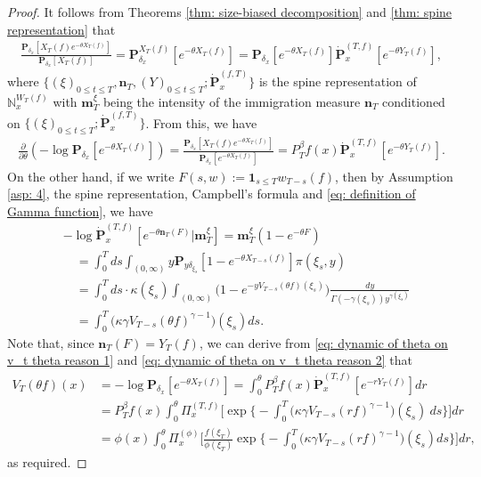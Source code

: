 \documentclass[12pt,a4paper]{amsart}
\theoremstyle{definition}
\numberwithin{equation}{section}
\begin{document}
\begin{proof}
	It follows from Theorems \ref{thm: size-biased decomposition} and \ref{thm: spine representation} that
  \begin{align}
    \frac{ \mathbf P_{\delta_x}[X_T(f)e^{-\theta X_T(f)}] } {  \mathbf P_{\delta_x} [X_T(f)] }
    = \mathbf P_{\delta_x}^{X_T(f)} [e^{-\theta X_T(f)}]
    = \mathbf P_{\delta_x} [e^{-\theta X_T(f)}] \dot {\mathbf P}_x^{(T,f)}[e^{-\theta Y_T(f)}],
\end{align}
where $\{(\xi)_{0\le t\le T}, \mathbf n_T, (Y)_{0\le t\le T}; \dot {\mathbf P}^{(f,T)}_x\}$ is the spine representation of $\mathbb N^{W_T(f)}_x$ with $\mathbf m^\xi_T$ being the intensity of the immigration measure $\mathbf n_T$ conditioned on $\{(\xi)_{0\le t\le T}; \dot {\mathbf P}^{(f,T)}_x\}$.
From this, we have
\begin{align} \label{eq: dynamic of theta on v_t theta reason 1}
	\frac{\partial}{\partial \theta}
	(-\log \mathbf P_{\delta_x}[e^{-\theta X_T(f)}])
	= \frac{\mathbf P_{\delta_x}[X_T(f)e^{-\theta X_T(f)}]}{\mathbf P_{\delta_x}[e^{-\theta X_T(f)}]}
	= P^\beta_T f(x) \dot {\mathbf P}_x^{(T,f)}[e^{-\theta Y_T(f)}].
\end{align}
On the other hand, if we write $F(s,w):= \mathbf 1_{s\leq T} w_{T-s}(f)$, then by Assumption \ref{asp: 4}, the spine representation, Campbell's formula and \eqref{eq: definition of Gamma function}, we have
\begin{align}\label{eq: dynamic of theta on v_t theta reason 2}
	&-\log \dot {\mathbf P}^{(T,f)}_{x}[e^{-\theta \mathbf n_T(F)}|\mathbf m_T^\xi]
   = \mathbf m_T^\xi(1-e^{-\theta F})
	\\ & \quad = \int_0^T ds \int_{(0,\infty)} y \mathbf P_{y\delta_{\xi_s}}[1- e^{-\theta X_{T-s}(f)}] \pi(\xi_s,y)
	\\ & \quad = \int_0^T ds \cdot \kappa(\xi_s) \int_{(0,\infty)} \mathbf (1- e^{- y V_{T-s}(\theta f)(\xi_s)}) \frac{dy}{\Gamma(-\gamma(\xi_s)) y^{\gamma(\xi_s)}}
	\\ & \quad = \int_0^T \big(\kappa\gamma V_{T-s}(\theta f)^{\gamma-1}\big)(\xi_s) ds.
\end{align}
Note that, since $\mathbf n_T(F)= Y_T(f)$, we can derive from \eqref{eq: dynamic of theta on v_t theta reason 1} and \eqref{eq: dynamic of theta on v_t theta reason 2} that
\begin{align}
	V_T(\theta f)(x)
	&= -\log \mathbf P_{\delta_x}[e^{-\theta X_T(f)}]
   = \int_0^\theta P^\beta_Tf(x)
   \dot {\mathbf P}_x^{(T,f)}[e^{-r  Y_T(f)}] dr
	\\ &=P^\beta_Tf(x)\int_0^\theta \Pi_x^{(T,f)} \Big[\exp\Big\{-\int_0^T \big(\kappa\gamma V_{T-s}(r f)^{\gamma-1}\big)(\xi_s)~ds\Big\}\Big] dr
	\\ &= \phi( x) \int_0^\theta \Pi_x^{(\phi)} \Big[ \frac{ f(\xi_T) } { \phi(\xi_T) } \exp\Big\{ - \int_0^T \big( \kappa \gamma V_{T-s} (r f)^{ \gamma - 1} \big) ( \xi_s) ds\Big\} \Big] dr,
\end{align}
as required.
\end{proof}
\end{document}
